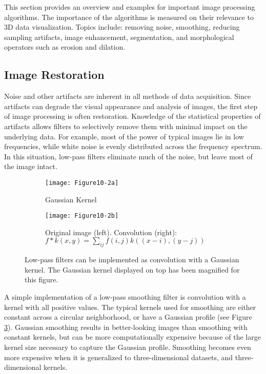 This section provides an overview and examples for important image processing algorithms. The importance of the algorithms is measured on their relevance to 3D data visualization. Topics include: removing noise, smoothing, reducing sampling artifacts, image enhancement, segmentation, and morphological operators such as erosion and dilation.

\subsection{Image Restoration}

Noise and other artifacts are inherent in all methods of data acquisition. Since artifacts can degrade the visual appearance and analysis of images, the first step of image processing is often restoration. Knowledge of the statistical properties of artifacts allows filters to selectively remove them with minimal impact on the underlying data. For example, most of the power of typical images lie in low frequencies, while white noise is evenly distributed across the frequency spectrum. In this situation, low-pass filters eliminate much of the noise, but leave most of the image intact.

\begin{figure}[htb]
	\begin{subfigure}[h]{0.24\linewidth}
		\texttt{[image: Figure10-2a]}
		\captionsetup{justification=centering}
		\caption*{Gaussian Kernel}
		\label{fig:Figure10-2a}
	\end{subfigure}
	\hfill
	\begin{subfigure}[h]{0.98\linewidth}
		\texttt{[image: Figure10-2b]}
		\captionsetup{justification=centering}
		\caption*{Original image (left). Convolution (right):
         $f*k(x,y) = \sum_{ij}f(i,j)k((x-i),(y-j))$}
		\label{fig:Figure10-2b}
	\end{subfigure}
	\caption{Low-pass filters can be implemented as convolution with a Gaussian kernel. The Gaussian kernel displayed on top has been magnified for this figure.}\label{fig:Figure10-2}
\end{figure}

A simple implementation of a low-pass smoothing filter is convolution with a kernel with all positive values. The typical kernels used for smoothing are either constant across a circular neighborhood, or have a Gaussian profile (see Figure \ref{fig:Figure10-2}). Gaussian smoothing results in better-looking images than smoothing with constant kernels, but can be more computationally expensive because of the large kernel size necessary to capture the Gaussian profile. Smoothing becomes even more expensive when it is generalized to three-dimensional datasets, and three-dimensional kernels.

